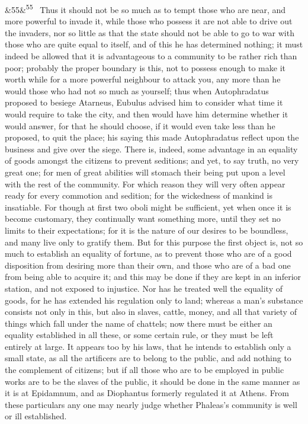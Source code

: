 \documentclass[12pt]{article}
\newcommand{\para}[1][]{\par\noindent\ifx&#1&\else\textsuperscript{\footnotesize #1}~\fi}
\begin{document}
\para[55] Thus it should not be so much as to tempt those who are near, and more powerful to invade it, while those who possess it are not able to drive out the invaders, nor so little as that the state should not be able to go to war with those who are quite equal to itself, and of this he has determined nothing; it must indeed be allowed that it is advantageous to a community to be rather rich than poor; probably the proper boundary is this, not to possess enough to make it worth while for a more powerful neighbour to attack you, any more than he would those who had not so much as yourself; thus when Autophradatus proposed to besiege Atarneus, Eubulus advised him to consider what time it would require to take the city, and then would have him determine whether it would answer, for that he should choose, if it would even take less than he proposed, to quit the place; his saying this made Autophradatus reflect upon the business and give over the siege. There is, indeed, some advantage in an equality of goods amongst the citizens to prevent seditions; and yet, to say truth, no very great one; for men of great abilities will stomach their being put upon a level with the rest of the community. For which reason they will very often appear ready for every commotion and sedition; for the wickedness of mankind is insatiable. For though at first two oboli might be sufficient, yet when once it is become customary, they continually want something more, until they set no limits to their expectations; for it is the nature of our desires to be boundless, and many live only to gratify them. But for this purpose the first object is, not so much to establish an equality of fortune, as to prevent those who are of a good disposition from desiring more than their own, and those who are of a bad one from being able to acquire it; and this may be done if they are kept in an inferior station, and not exposed to injustice. Nor has he treated well the equality of goods, for he has extended his regulation only to land; whereas a man's substance consists not only in this, but also in slaves, cattle, money, and all that variety of things which fall under the name of chattels; now there must be either an equality established in all these, or some certain rule, or they must be left entirely at large. It appears too by his laws, that he intends to establish only a small state, as all the artificers are to belong to the public, and add nothing to the complement of citizens; but if all those who are to be employed in public works are to be the slaves of the public, it should be done in the same manner as it is at Epidamnum, and as Diophantus formerly regulated it at Athens. From these particulars any one may nearly judge whether Phaleas's community is well or ill established.
\end{document}
